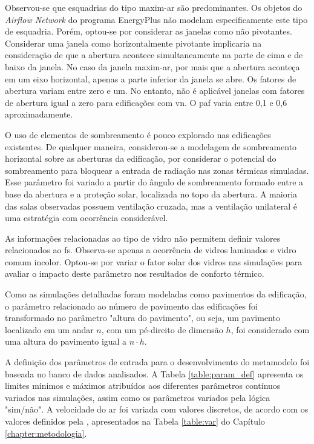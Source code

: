 \documentclass[brazil,hardcopy,openany]{ufscthesis} %
\begin{document}
Observou-se que esquadrias do tipo maxim-ar são predominantes. Os objetos do \textit{Airflow Network} do programa EnergyPlus não modelam especificamente este tipo de esquadria. Porém, optou-se por considerar as janelas como não pivotantes. Considerar uma janela como horizontalmente pivotante implicaria na consideração de que a abertura acontece simultaneamente na parte de cima e de baixo da janela. No caso da janela maxim-ar, por mais que a abertura aconteça em um eixo horizontal, apenas a parte inferior da janela se abre. 
Os fatores de abertura variam entre zero e um. No entanto, não é aplicável janelas com fatores de abertura igual a zero para edificações com \acrshort{vn}.
O \acrfull{paf} varia entre 0,1 e 0,6 aproximadamente.

O uso de elementos de sombreamento é pouco explorado nas edificações existentes. De qualquer maneira, considerou-se a modelagem de sombreamento horizontal sobre as aberturas da edificação, por considerar o potencial do sombreamento para bloquear a entrada de radiação nas zonas térmicas simuladas. Esse parâmetro foi variado a partir do ângulo de sombreamento formado entre a base da abertura e a proteção solar, localizada no topo da abertura.	
A maioria das salas observadas possuem ventilação cruzada, mas a ventilação unilateral é uma estratégia com ocorrência considerável.

As informações relacionadas ao tipo de vidro não permitem definir valores relacionados ao \acrfull{fs}. Observa-se apenas a ocorrência de vidros laminados e vidro comum incolor. Optou-se por variar o fator solar dos vidros nas simulações para avaliar o impacto deste parâmetro nos resultados de conforto térmico.

Como as simulações detalhadas foram modeladas como pavimentos da edificação, o parâmetro relacionado ao número de pavimento das edificações foi transformado no parâmetro "altura do pavimento", ou seja, um pavimento localizado em um andar $n$, com um pé-direito de dimensão $h$, foi considerado com uma altura do pavimento igual a $n{\cdot}h$.

A definição dos parâmetros de entrada para o desenvolvimento do metamodelo foi baseada no banco de dados analisados. A Tabela \ref{table:param_def} apresenta os limites mínimos e máximos atribuídos aos diferentes parâmetros contínuos variados nas simulações, assim como os parâmetros variados pela lógica "sim/não". A velocidade do ar foi variada com valores discretos, de acordo com os valores definidos pela , apresentados na Tabela \ref{table:var} do Capítulo \ref{chapter:metodologia}.
\end{document}
